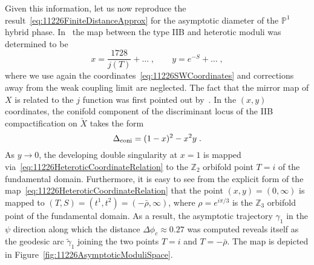 \documentclass[11pt,a4paper]{article}
\numberwithin{equation}{section}
\numberwithin{table}{section}\setlength{\multlinegap}{25pt}
\begin{document}
Given this information, let us now reproduce the result~\eqref{eq:11226FiniteDistanceApprox} for the asymptotic diameter of the $\mathbb{P}^1$ hybrid phase. In~\cite{Kachru:1995fv} the map between the type IIB and heterotic moduli was determined to be
\begin{equation}
    \label{eq:11226HeteroticCoordinateRelation}
    x=\frac{1728}{j(T)}+\dots\;,\qquad y=e^{-S}+\dots\;,
\end{equation}
where we use again the coordinates~\eqref{eq:11226SWCoordinates} and corrections away from the weak coupling limit are neglected. The fact that the mirror map of $X$ is related to the $j$ function was first pointed out by~\cite{Candelas:1993dm}. In the $(x,y)$ coordinates, the conifold component of the discriminant locus of the IIB compactification on $\check{X}$ takes the form
\begin{equation}
    \label{eq:11226Conifold}
    \Delta_\textup{coni}=(1-x)^2-x^2 y\;.
\end{equation}
As $y\to 0$, the developing double singularity at $x=1$ is mapped via~\eqref{eq:11226HeteroticCoordinateRelation} to the $\mathbb{Z}_2$ orbifold point $T=i$ of the fundamental domain. Furthermore, it is easy to see from the explicit form of the map~\eqref{eq:11226HeteroticCoordinateRelation} that the point $(x,y)=(0,\infty)$ is mapped to $(T,S)=(t^1,t^2)=(-\bar{\rho},\infty)$, where $\rho=e^{i \pi/3}$ is the $\mathbb{Z}_3$ orbifold point of the fundamental domain. As a result, the asymptotic trajectory $\gamma_1$ in the $\psi$ direction along which the distance $\Delta\phi_c\approx 0.27$ was computed reveals itself as the geodesic arc $\tilde{\gamma}_1$ joining the two points $T=i$ and $T=-\bar{\rho}$. The map is depicted in Figure~\ref{fig:11226AsymptoticModuliSpace}.
\end{document}
